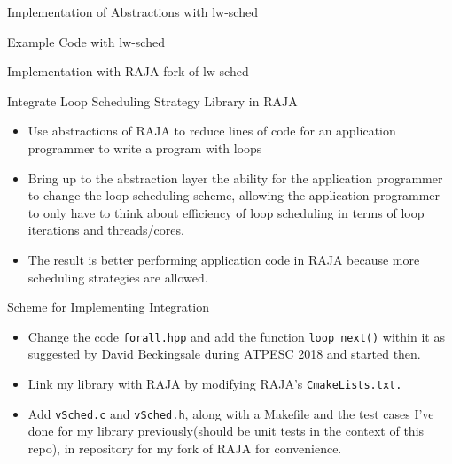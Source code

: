 \documentclass{beamer}
\begin{document}
\begin{frame}{Implementation of Abstractions with lw-sched}
\begin{figure}[ht!] 

\end{figure}
\end{frame}

\begin{frame}{Example Code with lw-sched}
\begin{figure}[ht!] 

\end{figure}
\end{frame}



\begin{frame}{Implementation with RAJA fork of lw-sched}
\begin{figure}[ht!] 

\end{figure}
\end{frame}






\begin{frame}{Integrate Loop Scheduling Strategy Library in RAJA}
\begin{itemize}
\item Use abstractions of RAJA to reduce lines of code for an application programmer to write a program with loops 
\item Bring up to the abstraction layer the ability for the application programmer to change the loop scheduling scheme, allowing the application programmer to only have to think about efficiency of loop scheduling in terms of loop iterations and threads/cores.  
\item The result is better performing application code in RAJA because more scheduling strategies are allowed. 
\end{itemize} 
\end{frame}

\begin{frame}{Scheme for Implementing Integration}
\begin{itemize}
\item Change the code {\tt forall.hpp} and add the function {\tt loop\_next()} within it as suggested by David Beckingsale during ATPESC 2018 and started then.
\item Link my library with RAJA by modifying RAJA's {\tt CmakeLists.txt.}
\item Add {\tt vSched.c} and {\tt vSched.h}, along with a Makefile and the test cases I've done for my library previously(should be unit tests in the context of this repo), in repository for my fork of RAJA for convenience.
\end{itemize}
\end{frame}
\end{document}
